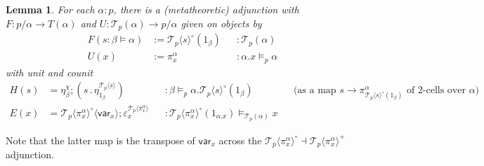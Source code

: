 \documentclass[10pt]{article}
\newtheorem{lemma}{Lemma}
\theoremstyle{definition}
\newcommand\TrCirc[2]{\ensuremath{{#1}^\circ(#2)}}
\newcommand\var[1]{\ensuremath{\mathsf{var}_{#1}}}
\newcommand\El[2]{\mathcal{T}_{#1}(#2)}
\newcommand\ApEl[2]{\mathcal{T}_{#1}\langle#2\rangle}
\newcommand\ap[2]{\ensuremath{#1 \langle #2 \rangle }}
\newcommand\bdot[0]{\mathbin{.}}
\begin{document}
\begin{lemma}
For each $\alpha : p$, there is a (metatheoretic) adjunction with $F : p/\alpha \to T(\alpha)$ and $U : \El{p}{\alpha} \to p/\alpha$ given on objects by
\begin{align*}
F(s : \beta \vDash \alpha) &:= \TrCirc{\ApEl{p}{s}}{1_\beta} &&: \El{p}{\alpha} \\
U(x) &:= \pi^\alpha_x &&: \alpha.x \vDash_p \alpha
\end{align*}
with unit and counit
\begin{align*}
H(s) &= \eta^\chi_\beta ; (s \bdot \eta^{\ApEl{p}{s}}_{1_\beta}) &&: \beta \vDash_p \alpha.\TrCirc{\ApEl{p}{s}}{1_\beta} && \text{(as a map $s \to \pi^\alpha_{\TrCirc{\ApEl{p}{s}}{1_\beta}}$ of 2-cells over $\alpha$)} \\
E(x) &= \ap{\ApEl{p}{\pi^\alpha_x}^\circ}{\var{x}} ; \varepsilon^{\ApEl{p}{\pi^\alpha_x}}_x &&: \TrCirc{\ApEl{p}{\pi^\alpha_x}}{1_{\alpha.x}} \vDash_{\El{p}{\alpha}} x
\end{align*}
\end{lemma}
Note that the latter map is the transpose of $\var{x}$ across the $\ApEl{p}{\pi^\alpha_x}^\circ \dashv \ApEl{p}{\pi^\alpha_x}^+$ adjunction.
\end{document}
